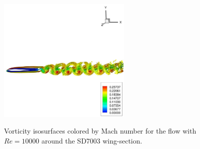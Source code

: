\begin{figure}
\centering
\includegraphics[height=60mm]{figure_939b} \\
\caption{Vorticity isosurfaces colored by Mach number for the flow with $Re = 10000$ around the SD7003 wing-section.}
\label{fig:figure_939b}
\end{figure}
\newpage
